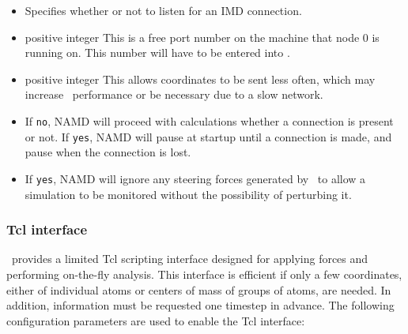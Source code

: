 \begin{itemize}
\item
{}
{Specifies whether or not to listen for an IMD connection.}

\item
{}
{positive integer}
{This is a free port number on the machine that node 0 is running on.
This number will have to be entered into \VMD.}

\item
{}
{positive integer}
{This allows coordinates to be sent less often, which may increase
\NAMD\ performance or be necessary due to a slow network.}

\item 
{}
{If {\tt no}, NAMD will proceed with calculations whether a connection is
present or not.  If {\tt yes}, NAMD will pause at startup until a connection is
made, and pause when the connection is lost.}

\item 
{}
{If {\tt yes}, NAMD will ignore any steering forces generated by \VMD\ to allow
a simulation to be monitored without the possibility of perturbing it.}

\end{itemize}


\subsubsection{Tcl interface}

\NAMD\ provides a limited Tcl scripting interface designed for applying forces and performing on-the-fly analysis.
This interface is efficient if only a few coordinates, either of individual atoms or centers of mass of groups of atoms, are needed.
In addition, information must be requested one timestep in advance.
The following configuration parameters are used to enable the Tcl interface:

